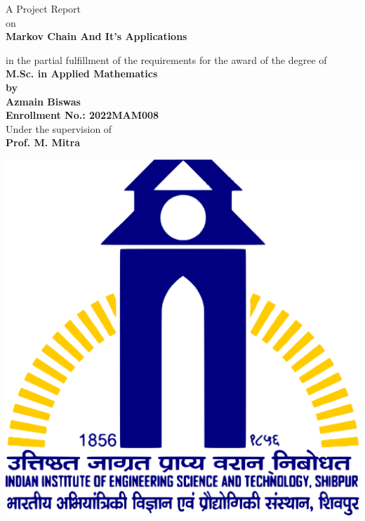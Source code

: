 \begin{titlepage}
    \thispagestyle{empty}
    \begin{center}

        \vspace{3cm}

        \Large{A Project Report\\ on}\\
        \huge{\textbf{Markov Chain And It's Applications}}

        \vspace{2cm}

        \large{{in the partial fulfillment of the requirements for the award of the degree of}}\\
        \Large{\textbf{M.Sc. in Applied Mathematics}}\\ 
        \large{\textbf{by}}\\ 
        \Large{\textbf{Azmain Biswas}}\\ 
        \large{\textbf{Enrollment No.: 2022MAM008}}\\ 
        \Large{Under the supervision of}\\ 
        \Large{\textbf{Prof. M. Mitra}}

        \vspace{2cm}

        \includegraphics[scale = 0.09]{pic/IIEST_Shibpur_Logo.svg.png}


\end{center}
\end{titlepage}
